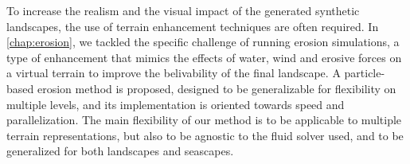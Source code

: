 


To increase the realism and the visual impact of the generated synthetic landscapes, the use of terrain enhancement techniques are often required. In \cref{chap:erosion}, we tackled the specific challenge of running erosion simulations, a type of enhancement that mimics the effects of water, wind and erosive forces on a virtual terrain to improve the belivability of the final landscape. A particle-based erosion method is proposed, designed to be generalizable for flexibility on multiple levels, and its implementation is oriented towards speed and parallelization. The main flexibility of our method is to be applicable to multiple terrain representations, but also to be agnostic to the fluid solver used, and to be generalized for both landscapes and seascapes.





